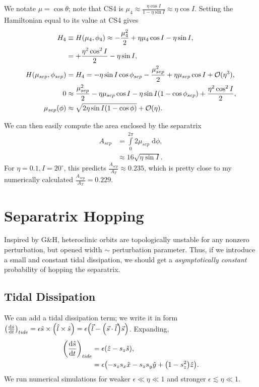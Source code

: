 \documentclass[11pt,
        usenames, %
        dvipsnames %
    ]{article}
\newcommand*{\rd}[2]{\frac{\mathrm{d}#1}{\mathrm{d}#2}}
\DeclarePairedDelimiter\p{\lparen}{\rparen}
\begin{document}
We notate $\mu = \cos\theta$; note that CS4 is $\mu_4 \approx \frac{\eta \cos
I}{1 - \eta \sin I} \approx \eta \cos I$. Setting the Hamiltonian equal to its
value at CS4 gives
\begin{align*}
    H_4 &\equiv H\p*{\mu_4, \phi_4}
        \approx -\frac{\mu_4^2}{2} + \eta \mu_4 \cos I - \eta \sin I,\\
        &= +\frac{\eta^2\cos^2 I}{2} - \eta \sin I,\\
    H(\mu_{sep}, \phi_{sep})
        &= H_4 = -\eta \sin I \cos \phi_{sep} - \frac{\mu_{sep}^2}{2} + \eta
            \mu_{sep} \cos I + \mathcal{O}(\eta^3),\\
    0 &\approx \frac{\mu_{sep}^2}{2} - \eta \mu_{sep} \cos I
        - \eta \sin I\p*{1 - \cos \phi_{sep}} + \frac{\eta^2\cos^2I}{2},\\
    \mu_{sep}\p*{\phi} &\approx \sqrt{2\eta \sin I\p*{1 - \cos \phi}}
        + \mathcal{O}(\eta).
\end{align*}

We can then easily compute the area enclosed by the separatrix
\begin{align}
    A_{sep} &= \int\limits_0^{2\pi}2\mu_{sep}\;\mathrm{d}\phi,\nonumber\\
        &\approx 16\sqrt{\eta \sin I}.
\end{align}
For $\eta = 0.1, I = 20^\circ$, this predicts $\frac{A_{sep}}{A_{T}} \approx
0.235$, which is pretty close to my numerically calculated $\frac{A_{sep}}{A_T}
= 0.229$.

\section{Separatrix Hopping}

Inspired by G\&H, heteroclinic orbits are topologically unstable for any nonzero
perturbation, but opened width $\sim$ perturbation parameter. Thus, if we
introduce a small and constant tidal dissipation, we should get a
\emph{asymptotically constant} probability of hopping the separatrix.

\subsection{Tidal Dissipation}

We can add a tidal dissipation term; we write it in form
$\p*{\rd{\hat{s}}{t}}_{tide} = \epsilon \hat{s} \times \p*{\hat{l} \times
\hat{s}} = \epsilon\p*{\vec{l} - \p*{\vec{s} \cdot \vec{l}}\vec{s}}$. Expanding,
\begin{align}
    \p*{\rd{\hat{s}}{t}}_{tide} &= \epsilon \p*{\hat{z} - s_z\hat{s}}
        ,\nonumber\\
        &= \epsilon \p*{-s_z s_x\hat{x} - s_zs_y\hat{y} + \p*{1 - s_z^2}
            \hat{z}}.
\end{align}
We run numerical simulations for weaker $\epsilon \ll \eta \ll 1$ and stronger
$\epsilon \lesssim \eta \ll 1$.
\end{document}

